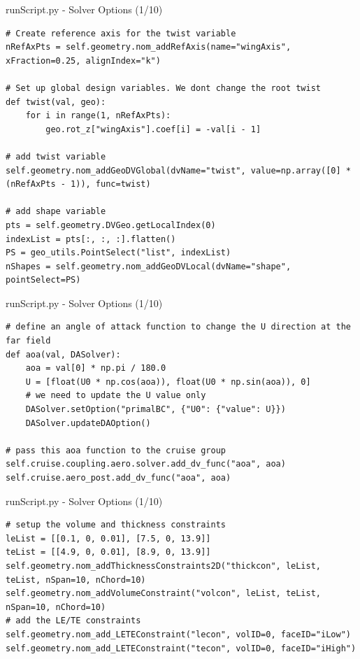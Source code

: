 \documentclass{bredelebeamer}
\begin{document}
\begin{frame}[fragile]{runScript.py - Solver Options (1/10)}
\scriptsize
\lstset{ language=bash }
\begin{lstlisting}
# Create reference axis for the twist variable
nRefAxPts = self.geometry.nom_addRefAxis(name="wingAxis", xFraction=0.25, alignIndex="k")

# Set up global design variables. We dont change the root twist
def twist(val, geo):
    for i in range(1, nRefAxPts):
        geo.rot_z["wingAxis"].coef[i] = -val[i - 1]

# add twist variable
self.geometry.nom_addGeoDVGlobal(dvName="twist", value=np.array([0] * (nRefAxPts - 1)), func=twist)

# add shape variable
pts = self.geometry.DVGeo.getLocalIndex(0)
indexList = pts[:, :, :].flatten()
PS = geo_utils.PointSelect("list", indexList)
nShapes = self.geometry.nom_addGeoDVLocal(dvName="shape", pointSelect=PS)
\end{lstlisting}
\normalsize
\end{frame}

\begin{frame}[fragile]{runScript.py - Solver Options (1/10)}
\scriptsize
\lstset{ language=bash }
\begin{lstlisting}
# define an angle of attack function to change the U direction at the far field
def aoa(val, DASolver):
    aoa = val[0] * np.pi / 180.0
    U = [float(U0 * np.cos(aoa)), float(U0 * np.sin(aoa)), 0]
    # we need to update the U value only
    DASolver.setOption("primalBC", {"U0": {"value": U}})
    DASolver.updateDAOption()

# pass this aoa function to the cruise group
self.cruise.coupling.aero.solver.add_dv_func("aoa", aoa)
self.cruise.aero_post.add_dv_func("aoa", aoa)
\end{lstlisting}
\normalsize
\end{frame}

\begin{frame}[fragile]{runScript.py - Solver Options (1/10)}
\scriptsize
\lstset{ language=bash }
\begin{lstlisting}
# setup the volume and thickness constraints
leList = [[0.1, 0, 0.01], [7.5, 0, 13.9]]
teList = [[4.9, 0, 0.01], [8.9, 0, 13.9]]
self.geometry.nom_addThicknessConstraints2D("thickcon", leList, teList, nSpan=10, nChord=10)
self.geometry.nom_addVolumeConstraint("volcon", leList, teList, nSpan=10, nChord=10)
# add the LE/TE constraints
self.geometry.nom_add_LETEConstraint("lecon", volID=0, faceID="iLow")
self.geometry.nom_add_LETEConstraint("tecon", volID=0, faceID="iHigh")
\end{lstlisting}
\normalsize
\end{frame}
\end{document}
